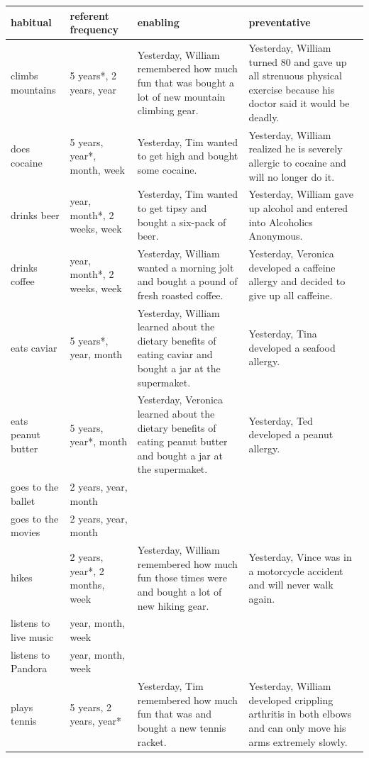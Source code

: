 \documentclass[english,,man,floatsintext]{apa6}
\theoremstyle{definition}
\theoremstyle{definition}
\theoremstyle{definition}
\theoremstyle{remark}
\begin{document}
\begingroup\fontsize{9pt}{10pt}\selectfont
\begin{longtable}{ |p{1in}|p{1.2in}| p{1.75in}|p{1.75in} |}
  \hline
{\bfseries habitual} & {\bfseries referent frequency} & {\bfseries enabling} & {\bfseries preventative} \\ 
  \hline
climbs mountains & 5 years*, 2 years, year & Yesterday, William remembered how much fun that was bought a lot of new mountain climbing gear. & Yesterday, William turned 80 and gave up all strenuous physical exercise because his doctor said it would be deadly. \\ 
   \hline
does cocaine & 5 years, year*, month, week & Yesterday, Tim wanted to get high and bought some cocaine. & Yesterday, William realized he is severely allergic to cocaine and will no longer do it. \\ 
   \hline
drinks beer & year, month*, 2 weeks, week & Yesterday, Tim wanted to get tipsy and bought a six-pack of beer. & Yesterday, William gave up alcohol and entered into Alcoholics Anonymous. \\ 
   \hline
drinks coffee & year, month*, 2 weeks, week & Yesterday, William wanted a morning jolt and bought a pound of fresh roasted coffee. & Yesterday, Veronica developed a caffeine allergy and decided to give up all caffeine. \\ 
   \hline
eats caviar & 5 years*, year, month & Yesterday, William learned about the dietary benefits of eating caviar and bought a jar at the supermaket. & Yesterday, Tina developed a seafood allergy. \\ 
   \hline
eats peanut butter & 5 years, year*, month & Yesterday, Veronica learned about the dietary benefits of eating peanut butter and bought a jar at the supermaket. & Yesterday, Ted developed a peanut allergy. \\ 
   \hline
goes to the ballet & 2 years, year, month &  &  \\ 
   \hline
goes to the movies & 2 years, year, month &  &  \\ 
   \hline
hikes & 2 years, year*, 2 months, week & Yesterday, William remembered how much fun those times were and bought a lot of new hiking gear. & Yesterday, Vince was in a motorcycle accident and will never walk again. \\ 
   \hline
listens to live music & year, month, week &  &  \\ 
   \hline
listens to Pandora & year, month, week &  &  \\ 
   \hline
plays tennis & 5 years, 2 years, year* & Yesterday, Tim remembered how much fun that was and bought a new tennis racket. & Yesterday, William developed crippling arthritis in both elbows and can only move his arms extremely slowly. \\ 

\end{longtable}
\end{document}
